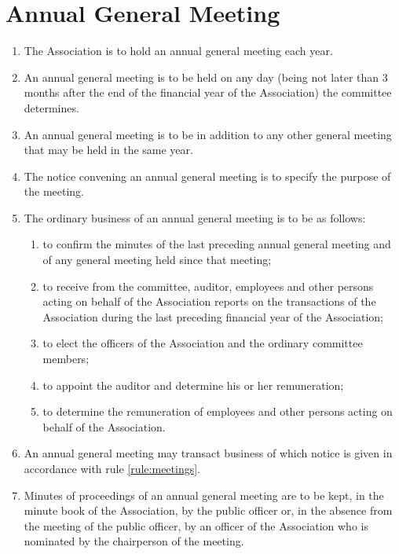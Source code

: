 \documentclass[a4paper,11pt]{article}
\begin{document}
\section{Annual General Meeting}
\label{rule:agm}

\begin{enumerate}
	\item The Association is to hold an annual general meeting each year.
	\item An annual general meeting is to be held on any day (being not later than 3 months after the end of the financial year of the Association) the committee determines.
	\item An annual general meeting is to be in addition to any other general meeting that may be held in the same year.
	\item The notice convening an annual general meeting is to specify the purpose of the meeting.
	
	\item \label{subrule:agm:ordinaryBusiness} The ordinary business of an annual general meeting is to be as follows:
	\begin{enumerate}
		\item to confirm the minutes of the last preceding annual general meeting and of any general meeting held since that meeting;
		\item \label{subsubrule:agm:ordinaryBusiness:reports} to receive from the committee, auditor, employees and other persons acting on behalf of the Association reports on the transactions of the Association during the last preceding financial year of the Association;
		\item to elect the officers of the Association and the ordinary committee members;
		\item \label{subsubrule:agm:ordinaryBusiness:auditor} to appoint the auditor and determine his or her remuneration;
		\item to determine the remuneration of employees and other persons acting on behalf of the Association.
	\end{enumerate}
	
	\item An annual general meeting may transact business of which notice is given in accordance with rule \ref{rule:meetings}.
	\item Minutes of proceedings of an annual general meeting are to be kept, in the minute book of the Association, by the public officer or, in the absence from the meeting of the public officer, by an officer of the Association who is nominated by the chairperson of the meeting.
\end{enumerate}
\end{document}

